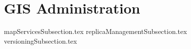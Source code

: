\documentclass{book}
\title{}  %
\begin{document}
\ifstandalone
\maketitle %
\clearpage
\tableofcontents %
\clearpage
\fi


% 
\section{GIS Administration}

{mapServicesSubsection.tex}
{replicaManagementSubsection.tex}
{versioningSubsection.tex}
\end{document}
